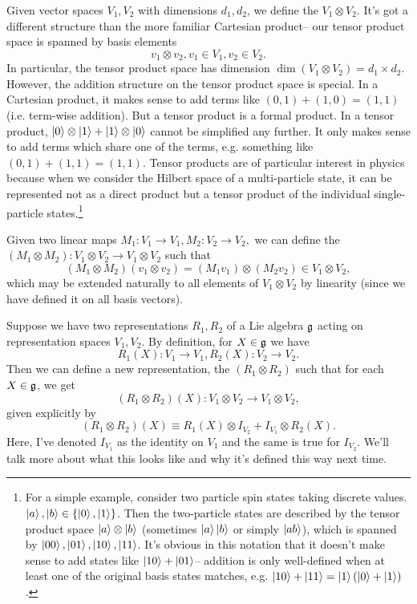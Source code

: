 \begin{defn}
Given vector spaces $V_1,V_2$ with dimensions $d_1,d_2$, we define the  $V_1 \otimes V_2$. It's got a different structure than the more familiar Cartesian product-- our tensor product space is spanned by basis elements
$$v_1 \otimes v_2, v_1\in V_1,v_2\in V_2.$$
In particular, the tensor product space has dimension $\dim(V_1\otimes V_2)=d_1 \times d_2$.
However, the addition structure on the tensor product space is special. In a Cartesian product, it makes sense to add terms like $(0,1)+(1,0)=(1,1)$ (i.e. term-wise addition). But a tensor product is a formal product. In a tensor product, $\left| 0 \right>\otimes \left| 1 \right> + \left| 1 \right>\otimes \left| 0 \right>$ cannot be simplified any further. It only makes sense to add terms which share one of the terms, e.g. something like $(0,1)+(1,1)=(1,1).$ Tensor products are of particular interest in physics because when we consider the Hilbert space of a multi-particle state, it can be represented not as a direct product but a tensor product of the individual single-particle states.\footnote{For a simple example, consider two particle spin states taking discrete values. $\left| a \right>,\left| b \right>\in \{\left| 0 \right>,\left| 1 \right>\}$. Then the two-particle states are described by the tensor product space $\left| a \right>\otimes\left| b \right>$ (sometimes $\left| a \right>\left| b \right>$ or simply $\left| ab \right>$), which is spanned by $\left| 00 \right>,\left| 01 \right>,\left| 10 \right>,\left| 11 \right>$. It's obvious in this notation that it doesn't make sense to add states like $\left| 10 \right>+\left| 01 \right>$-- addition is only well-defined when at least one of the original basis states matches, e.g. $\left| 10 \right>+\left| 11 \right>=\left| 1 \right>(\left| 0 \right>+\left| 1 \right>)$.}

Given two linear maps $M_1:V_1\to V_1,M_2: V_2\to V_2,$ we can define the  $(M_1\otimes M_2): V_1\otimes V_2 \to V_1 \otimes V_2$ such that
$$(M_1\otimes M_2)(v_1\otimes v_2)=(M_1 v_1)\otimes (M_2 v_2) \in V_1\otimes V_2,$$
which may be extended naturally to all elements of $V_1\otimes V_2$ by linearity (since we have defined it on all basis vectors).
\end{defn}
\begin{defn}
Suppose we have two representations $R_1,R_2$ of a Lie algebra $\mathfrak{g}$ acting on representation spaces $V_1,V_2$. By definition, for $X\in\mathfrak{g}$ we have
$$R_1(X):V_1\to V_1, R_2(X):V_2\to V_2.$$
Then we can define a new representation, the  $(R_1\otimes R_2)$ such that for each $X\in \mathfrak{g}$, we get
$$(R_1\otimes R_2)(X):V_1 \otimes V_2 \to V_1 \otimes V_2,$$
given explicitly by
$$(R_1\otimes R_2)(X)\equiv R_1(X) \otimes I_{V_2} + I_{V_1} \otimes R_2(X).$$
Here, I've denoted $I_{V_1}$ as the identity on $V_1$ and the same is true for $I_{V_2}$. We'll talk more about what this looks like and why it's defined this way next time.
\end{defn}
